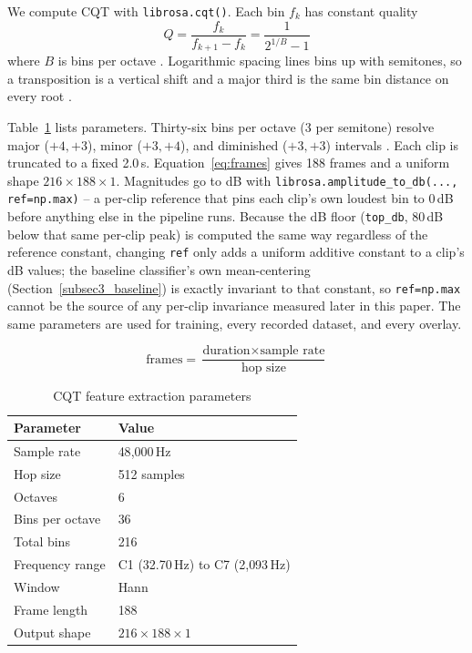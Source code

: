 \documentclass[pdflatex,sn-mathphys-num,iicol]{sn-jnl}
\theoremstyle{thmstyleone}
\theoremstyle{thmstyletwo}
\theoremstyle{thmstylethree}
\begin{document}
We compute CQT with \texttt{librosa.cqt()}. Each bin $f_k$ has constant quality
\begin{equation}
Q = \frac{f_k}{f_{k+1} - f_k} = \frac{1}{2^{1/B} - 1}
\label{eq:cqt}
\end{equation}
where $B$ is bins per octave \cite{Li2021}\cite{Lacoste2007}. Logarithmic spacing lines bins up with semitones, so a transposition is a vertical shift and a major third is the same bin distance on every root \cite{Harte2010}.

Table~\ref{tab:cqt-extraction-params} lists parameters. Thirty-six bins per octave (3 per semitone) resolve major ($+4,+3$), minor ($+3,+4$), and diminished ($+3,+3$) intervals \cite{Akram2025}\cite{OHanlon2021}. Each clip is truncated to a fixed 2.0\,s. Equation~\ref{eq:frames} gives 188 frames and a uniform shape $216 \times 188 \times 1$. Magnitudes go to dB with \texttt{librosa.amplitude\_to\_db(..., ref=np.max)} -- a per-clip reference that pins each clip's own loudest bin to 0\,dB before anything else in the pipeline runs. Because the dB floor (\texttt{top\_db}, 80\,dB below that same per-clip peak) is computed the same way regardless of the reference constant, changing \texttt{ref} only adds a uniform additive constant to a clip's dB values; the baseline classifier's own mean-centering (Section~\ref{subsec3_baseline}) is exactly invariant to that constant, so \texttt{ref=np.max} cannot be the source of any per-clip invariance measured later in this paper. The same parameters are used for training, every recorded dataset, and every overlay.

\begin{equation}
\text{frames} = \frac{\text{duration} \times \text{sample rate}}{\text{hop size}}
\label{eq:frames}
\end{equation}

\begin{table}[t]
\caption{CQT feature extraction parameters}\label{tab:cqt-extraction-params}
\begin{tabular}{@{}ll@{}}
\toprule
Parameter & Value \\
\midrule
Sample rate & 48{,}000\,Hz \\
Hop size & 512 samples \\
Octaves & 6 \\
Bins per octave & 36 \\
Total bins & 216 \\
Frequency range & C1 (32.70\,Hz) to C7 (2{,}093\,Hz) \\
Window & Hann \\
Frame length & 188 \\
Output shape & $216 \times 188 \times 1$ \\
\bottomrule
\end{tabular}
\end{table}
\end{document}
